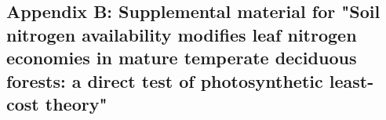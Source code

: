\begin{singlespace}
    \chapter{\textbf{Appendix B: Supplemental material for "Soil nitrogen availability modifies leaf nitrogen economies in mature temperate deciduous forests: a direct test of photosynthetic least-cost theory"}}
\end{singlespace}

\setcounter{table}{0}
\renewcommand{\thetable}{B\arabic{table}}

\setcounter{figure}{0}
\renewcommand{\thefigure}{B\arabic{figure}}

\begin{table}[h!]
    \caption[Sample sizes of each species, abbreviated by their USDA NRCS PLANTS database code, within each plot at each site]{Sample sizes of each species, abbreviated by their USDA NRCS PLANTS database code, within each plot at each site$^*$}
    \label{table:tab.b1}
\end{table}
